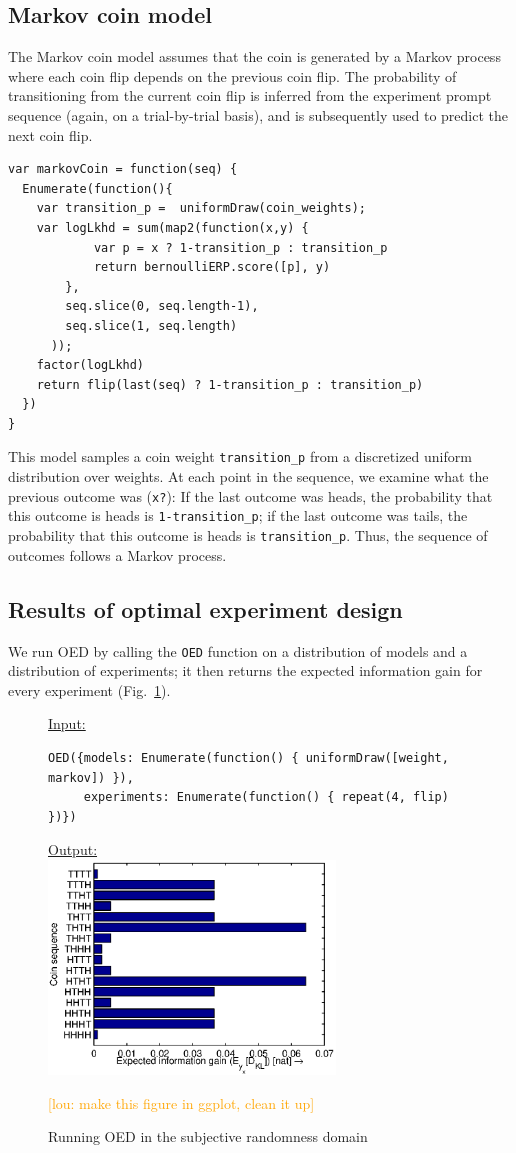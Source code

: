 \documentclass{article}
\newcommand{\lou}[1]{\textcolor{orange}{[lou: #1]}}
\begin{document}
\subsection{Markov coin model}
\label{s:tutorial:sss:markov}
The Markov coin model assumes that the coin is generated by a Markov process where each coin flip depends on the previous coin flip. The probability of transitioning from the current coin flip is inferred from the experiment prompt sequence (again, on a trial-by-trial basis), and is subsequently used to predict the next coin flip.
%
\begin{lstlisting}[caption=Markov coin model]
var markovCoin = function(seq) {
  Enumerate(function(){
    var transition_p =  uniformDraw(coin_weights);
    var logLkhd = sum(map2(function(x,y) {
    		var p = x ? 1-transition_p : transition_p
     	 	return bernoulliERP.score([p], y)
    	},
    	seq.slice(0, seq.length-1),
    	seq.slice(1, seq.length)
	  ));
    factor(logLkhd)
    return flip(last(seq) ? 1-transition_p : transition_p)
  })
}
\end{lstlisting}
%
This model samples a coin weight \lstinline{transition_p} from a discretized uniform distribution over weights.
At each point in the sequence, we examine what the previous outcome was (\lstinline{x?}): If the last outcome was heads, the probability that this outcome is heads is \lstinline{1-transition_p}; if the last outcome was tails, the probability that this outcome is heads is \lstinline{transition_p}. Thus, the sequence of outcomes follows a Markov process.

\subsection{Results of optimal experiment design}

We run OED by calling the \lstinline{OED} function on a distribution of models and a distribution of experiments; it then returns the expected information gain for every experiment (Fig.~\ref{fig:run-coin}).

\begin{figure}[h!]
\underline{\textsf{Input:}}
\begin{lstlisting}
OED({models: Enumerate(function() { uniformDraw([weight, markov]) }),
     experiments: Enumerate(function() { repeat(4, flip) })})
\end{lstlisting}

\underline{\textsf{Output:}}\\
\includegraphics[width=3in]{img/coin.eps}
\caption{Running OED in the subjective randomness domain}
\lou{make this figure in ggplot, clean it up}
\label{fig:run-coin}
\end{figure}
\end{document}
